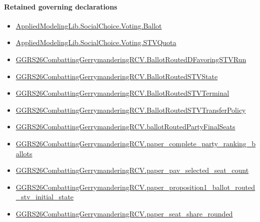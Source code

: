 \documentclass[10pt]{article}
\begin{document}
\paragraph{Retained governing declarations}
\begin{itemize}\raggedright
\item \hyperlink{governing-declaration-4c0320b08e4fb484}{Applied\allowbreak{}Modeling\allowbreak{}Lib.\allowbreak{}Social\allowbreak{}Choice.\allowbreak{}Voting.\allowbreak{}Ballot}
\item \hyperlink{governing-declaration-d335879a7207e841}{Applied\allowbreak{}Modeling\allowbreak{}Lib.\allowbreak{}Social\allowbreak{}Choice.\allowbreak{}Voting.\allowbreak{}STV\allowbreak{}Quota}
\item \hyperlink{governing-declaration-3bfffc20e8b6444f}{GGRS26\allowbreak{}Combatting\allowbreak{}Gerrymandering\allowbreak{}RCV.\allowbreak{}Ballot\allowbreak{}Routed\allowbreak{}D\allowbreak{}Favoring\allowbreak{}STV\allowbreak{}Run}
\item \hyperlink{governing-declaration-8b872df78d871e1b}{GGRS26\allowbreak{}Combatting\allowbreak{}Gerrymandering\allowbreak{}RCV.\allowbreak{}Ballot\allowbreak{}Routed\allowbreak{}STV\allowbreak{}State}
\item \hyperlink{governing-declaration-27b5b75da6f75108}{GGRS26\allowbreak{}Combatting\allowbreak{}Gerrymandering\allowbreak{}RCV.\allowbreak{}Ballot\allowbreak{}Routed\allowbreak{}STV\allowbreak{}Terminal}
\item \hyperlink{governing-declaration-9554b7918969e197}{GGRS26\allowbreak{}Combatting\allowbreak{}Gerrymandering\allowbreak{}RCV.\allowbreak{}Ballot\allowbreak{}Routed\allowbreak{}STV\allowbreak{}Transfer\allowbreak{}Policy}
\item \hyperlink{governing-declaration-21463db3a6da8b5e}{GGRS26\allowbreak{}Combatting\allowbreak{}Gerrymandering\allowbreak{}RCV.\allowbreak{}ballot\allowbreak{}Routed\allowbreak{}Party\allowbreak{}Final\allowbreak{}Seats}
\item \hyperlink{governing-declaration-ab89c07c272f0ccf}{GGRS26\allowbreak{}Combatting\allowbreak{}Gerrymandering\allowbreak{}RCV.\allowbreak{}paper\_\allowbreak{}complete\_\allowbreak{}party\_\allowbreak{}ranking\_\allowbreak{}ballots}
\item \hyperlink{paper-prerequisite-c0f468d3ce4de7e0}{GGRS26\allowbreak{}Combatting\allowbreak{}Gerrymandering\allowbreak{}RCV.\allowbreak{}paper\_\allowbreak{}pav\_\allowbreak{}selected\_\allowbreak{}seat\_\allowbreak{}count}
\item \hyperlink{governing-declaration-a26378e50367c86c}{GGRS26\allowbreak{}Combatting\allowbreak{}Gerrymandering\allowbreak{}RCV.\allowbreak{}paper\_\allowbreak{}proposition1\_\allowbreak{}ballot\_\allowbreak{}routed\_\allowbreak{}stv\_\allowbreak{}initial\_\allowbreak{}state}
\item \hyperlink{governing-declaration-64adc81e0c40ba7a}{GGRS26\allowbreak{}Combatting\allowbreak{}Gerrymandering\allowbreak{}RCV.\allowbreak{}paper\_\allowbreak{}seat\_\allowbreak{}share\_\allowbreak{}rounded}
\end{itemize}
\end{document}
